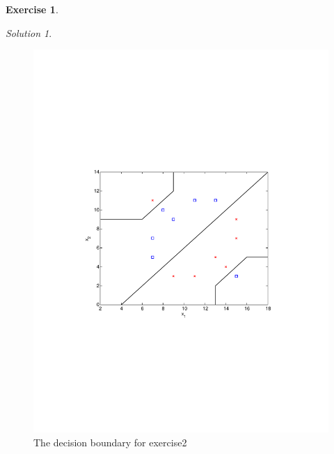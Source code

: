 \documentclass[a4paper,twoside=false,abstract=false,numbers=noenddot,
titlepage=false,headings=small,parskip=half,version=last]{scrartcl}
\theoremstyle{definition}
\newtheorem{exercise}{Exercise}
\theoremstyle{remark}
\newtheorem*{solution}{Solution}
\begin{document}
\begin{exercise}
\bf{
    
}
\end{exercise}
\begin{solution}
    
\end{solution}


\pagebreak
\begin{figure}[t]
    \vspace{-270pt}
    \begin{center}
        \includegraphics[width=1.0\textwidth]{exercise2.pdf}
    \end{center}
    \vspace{-170pt}
    \caption{The decision boundary for exercise2}
    \label{fig:exercise2}
\end{figure}
\end{document}
